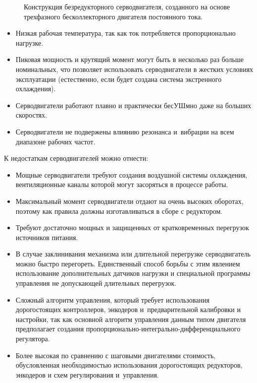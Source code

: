 \begin{figure}[ht]
	\caption{Конструкция безредукторного серводвигателя, созданного на основе трехфазного бесколлекторного двигателя постоянного тока.}\label{fig:servo}
\end{figure}

\begin{itemize}
	\item Низкая рабочая температура, так как ток потребляется пропорционально нагрузке.
	
	\item Пиковая мощность и крутящий момент могут быть в несколько раз больше номинальных, что позволяет использовать серводвигатели в жестких условиях эксплуатации (естественно, если будет создана система экстренного охлаждения).
	
	\item Серводвигатели работают плавно и практически бесУШмно даже на больших скоростях.
	
	\item Серводвигатели не подвержены влиянию резонанса и~вибрации на всем диапазоне рабочих частот.
\end{itemize}

К недостаткам серводвигателей можно отнести:

\begin{itemize}
	\item Мощные серводвигатели требуют создания воздушной системы охлаждения, вентиляционные каналы которой могут засоряться в процессе работы.
	
	\item Максимальный момент серводвигатели отдают на очень высоких оборотах, поэтому как правила должны изготавливаться в сборе с редуктором.
	
	\item Требуют достаточно мощных и защищенных от кратковременных перегрузок источников питания.
	
	\item В случае заклинивания механизма или длительной перегрузке серводвигатель можно быстро перегореть. Единственный способ борьбы с этим явлением использование дополнительных датчиков нагрузки и специальной программы управления не допускающей длительных перегрузок.
	
	\item Сложный алгоритм управления, который требует использования дорогостоящих контроллеров, энкодеров и~предварительной калибровки и настройки, так как основной алгоритм управления данным типом двигателя предполагает создания пропорционально-интегрально-дифференциального регулятора.
	
	\item Более высокая по сравнению с шаговыми двигателями стоимость, обусловленная необходимостью использования дорогостоящих редукторов, энкодеров и схем регулирования и~управления.
\end{itemize}

